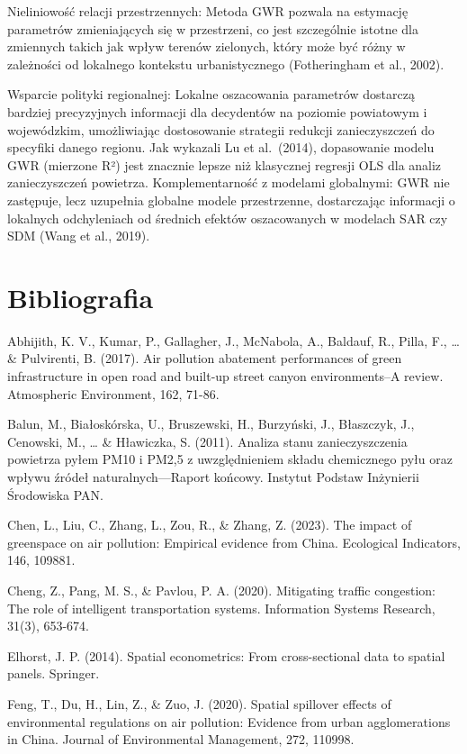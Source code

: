 \documentclass[
  11pt,
]{article}
\begin{document}
Nieliniowość relacji przestrzennych: Metoda GWR pozwala na estymację
parametrów zmieniających się w przestrzeni, co jest szczególnie istotne
dla zmiennych takich jak wpływ terenów zielonych, który może być różny w
zależności od lokalnego kontekstu urbanistycznego (Fotheringham et al.,
2002).

Wsparcie polityki regionalnej: Lokalne oszacowania parametrów dostarczą
bardziej precyzyjnych informacji dla decydentów na poziomie powiatowym i
wojewódzkim, umożliwiając dostosowanie strategii redukcji zanieczyszczeń
do specyfiki danego regionu. Jak wykazali Lu et al.~(2014), dopasowanie
modelu GWR (mierzone R²) jest znacznie lepsze niż klasycznej regresji
OLS dla analiz zanieczyszczeń powietrza. Komplementarność z modelami
globalnymi: GWR nie zastępuje, lecz uzupełnia globalne modele
przestrzenne, dostarczając informacji o lokalnych odchyleniach od
średnich efektów oszacowanych w modelach SAR czy SDM (Wang et al.,
2019).

\section{Bibliografia}\label{bibliografia}

Abhijith, K. V., Kumar, P., Gallagher, J., McNabola, A., Baldauf, R.,
Pilla, F., \ldots{} \& Pulvirenti, B. (2017). Air pollution abatement
performances of green infrastructure in open road and built-up street
canyon environments--A review. Atmospheric Environment, 162, 71-86.

Balun, M., Białoskórska, U., Bruszewski, H., Burzyński, J., Błaszczyk,
J., Cenowski, M., \ldots{} \& Hławiczka, S. (2011). Analiza stanu
zanieczyszczenia powietrza pyłem PM10 i PM2,5 z uwzględnieniem składu
chemicznego pyłu oraz wpływu źródeł naturalnych---Raport końcowy.
Instytut Podstaw Inżynierii Środowiska PAN.

Chen, L., Liu, C., Zhang, L., Zou, R., \& Zhang, Z. (2023). The impact
of greenspace on air pollution: Empirical evidence from China.
Ecological Indicators, 146, 109881.

Cheng, Z., Pang, M. S., \& Pavlou, P. A. (2020). Mitigating traffic
congestion: The role of intelligent transportation systems. Information
Systems Research, 31(3), 653-674.

Elhorst, J. P. (2014). Spatial econometrics: From cross-sectional data
to spatial panels. Springer.

Feng, T., Du, H., Lin, Z., \& Zuo, J. (2020). Spatial spillover effects
of environmental regulations on air pollution: Evidence from urban
agglomerations in China. Journal of Environmental Management, 272,
110998.
\end{document}
